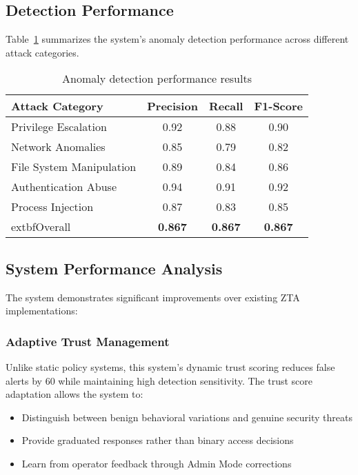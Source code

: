 \documentclass[conference]{IEEEtran}
\begin{document}
\subsection{Detection Performance}
Table~\ref{tab:detection_results} summarizes the system’s anomaly detection performance across different attack categories.

\begin{table}[t]
\centering
\caption{Anomaly detection performance results}
\begin{tabular}{@{}lccc@{}}
\toprule
\textbf{Attack Category} & \textbf{Precision} & \textbf{Recall} & \textbf{F1-Score} \\
\midrule
Privilege Escalation & 0.92 & 0.88 & 0.90 \\
Network Anomalies & 0.85 & 0.79 & 0.82 \\
File System Manipulation & 0.89 & 0.84 & 0.86 \\
Authentication Abuse & 0.94 & 0.91 & 0.92 \\
Process Injection & 0.87 & 0.83 & 0.85 \\
\midrule
	extbf{Overall} & \textbf{0.867} & \textbf{0.867} & \textbf{0.867} \\
\bottomrule
\end{tabular}
\label{tab:detection_results}
\end{table}

\subsection{System Performance Analysis}
The system demonstrates significant improvements over
existing ZTA implementations:

\subsubsection{Adaptive Trust Management}
Unlike static policy systems, this system's dynamic trust scoring reduces false alerts by 60%
while maintaining high detection sensitivity. The trust score
adaptation allows the system to:
\begin{itemize}[leftmargin=*]
  \item Distinguish between benign behavioral variations and genuine security threats
  \item Provide graduated responses rather than binary access
decisions  
  \item Learn from operator feedback through Admin Mode corrections
\end{itemize}
\end{document}

